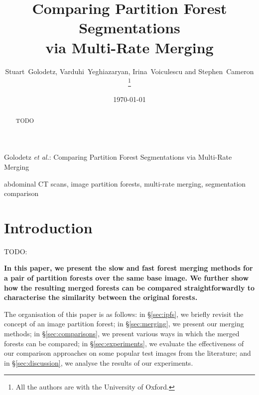 \documentclass[10pt,twocolumn,twoside]{IEEEtran}
\begin{document}
\title{Comparing Partition Forest Segmentations \\ via Multi-Rate Merging}

\author{Stuart~Golodetz, Varduhi~Yeghiazaryan, Irina~Voiculescu and Stephen~Cameron%
\thanks{All the authors are with the University of Oxford.}}

\date{\today}

%
{Golodetz \MakeLowercase{\textit{et al.}}: Comparing Partition Forest Segmentations via Multi-Rate Merging}


\maketitle

\begin{abstract}
\noindent TODO
\end{abstract}

\begin{IEEEkeywords}
abdominal CT scans, image partition forests, multi-rate merging, segmentation comparison
\end{IEEEkeywords}

\IEEEpeerreviewmaketitle

\section{Introduction}

TODO: \cite{golodetz11}

\textbf{In this paper, we present the slow and fast forest merging methods for a pair of partition forests over the same base image. We further show how the resulting merged forests can be compared straightforwardly to characterise the similarity between the original forests.}

The organisation of this paper is as follows: in \S\ref{sec:ipfs}, we briefly revisit the concept of an image partition forest; in \S\ref{sec:merging}, we present our merging methods; in \S\ref{sec:comparisons}, we present various ways in which the merged forests can be compared; in \S\ref{sec:experiments}, we evaluate the effectiveness of our comparison approaches on some popular test images from the literature; and in \S\ref{sec:discussion}, we analyse the results of our experiments.

\end{document}
